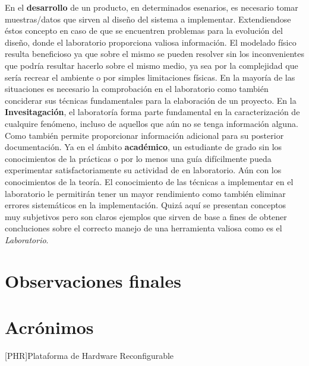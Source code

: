 \documentclass[a4paper]{article}
\begin{document}
En el \textbf{desarrollo} de un producto, en determinados esenarios, es necesario tomar muestras/datos que sirven al diseño del sistema a implementar. Extendiendose éstos concepto en caso de que se encuentren problemas para la evolución del diseño, donde el laboratorio proporciona valiosa información. El modelado físico resulta beneficioso ya que sobre el mismo se pueden resolver sin los inconvenientes que podría resultar hacerlo sobre el mismo medio, ya sea por la complejidad que sería recrear el ambiente o por simples limitaciones físicas. En la mayoría de las situaciones es necesario la comprobación en el laboratorio como también conciderar sus técnicas fundamentales para la elaboración de un proyecto.
En la \textbf{Invesitagación}, el laboratoría forma parte fundamental en la caracterización de cualquire fenómeno, incluso de aquellos que aún no se tenga información alguna. Como también permite proporcionar información adicional para su posterior documentación.
Ya en el ámbito \textbf{académico}, un estudiante de grado sin los conocimientos de la prácticas o por lo menos una guía difícilmente pueda experimentar satisfactoriamente su actividad de en laboratorio. Aún con los conocimientos de la teoría. El conocimiento de las técnicas a implementar en el laboratorio le permitirán tener un mayor rendimiento como también eliminar errores sistemáticos en la implementación.
Quizá aquí se presentan conceptos muy subjetivos pero son claros ejemplos que sirven de base a fines de obtener concluciones sobre el correcto manejo de una herramienta valiosa como es el \emph{Laboratorio}.
\section{Observaciones finales}

\appendix{}
\section{Acrónimos}
\begin{acronym}
  [PHR]{Plataforma de Hardware Reconfigurable}
\end{acronym}
\end{document}
